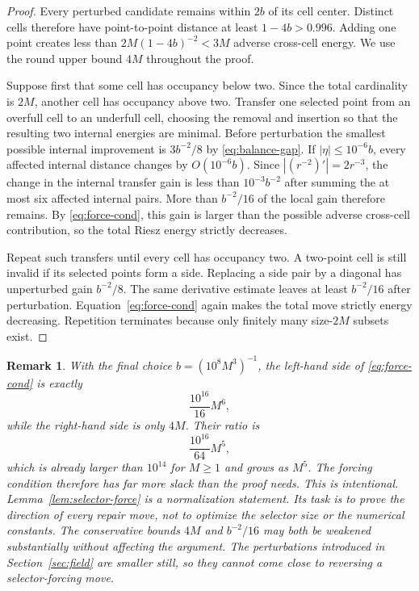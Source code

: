 \documentclass[12pt,a4paper]{article}
\newtheorem{remark}[theorem]{Remark}
\begin{document}
\begin{proof}
Every perturbed candidate remains within $2b$ of its cell center.  Distinct cells therefore have point-to-point distance at least $1-4b>0.996$.  Adding one point creates less than $2M(1-4b)^{-2}<3M$ adverse cross-cell energy.  We use the round upper bound $4M$ throughout the proof.

Suppose first that some cell has occupancy below two.  Since the total cardinality is $2M$, another cell has occupancy above two.  Transfer one selected point from an overfull cell to an underfull cell, choosing the removal and insertion so that the resulting two internal energies are minimal.  Before perturbation the smallest possible internal improvement is $3b^{-2}/8$ by \eqref{eq:balance-gap}.  If $|\eta|\le10^{-6}b$, every affected internal distance changes by $O(10^{-6}b)$.  Since $|(r^{-2})'|=2r^{-3}$, the change in the internal transfer gain is less than $10^{-3}b^{-2}$ after summing the at most six affected internal pairs.  More than $b^{-2}/16$ of the local gain therefore remains.  By \eqref{eq:force-cond}, this gain is larger than the possible adverse cross-cell contribution, so the total Riesz energy strictly decreases.

Repeat such transfers until every cell has occupancy two.  A two-point cell is still invalid if its selected points form a side.  Replacing a side pair by a diagonal has unperturbed gain $b^{-2}/8$.  The same derivative estimate leaves at least $b^{-2}/16$ after perturbation.  Equation~\eqref{eq:force-cond} again makes the total move strictly energy decreasing.  Repetition terminates because only finitely many size-$2M$ subsets exist.
\end{proof}

\begin{remark}
With the final choice $b=(10^8M^3)^{-1}$, the left-hand side of \eqref{eq:force-cond} is exactly
\[
 \frac{10^{16}}{16}M^6,
\]
while the right-hand side is only $4M$.  Their ratio is
\[
 \frac{10^{16}}{64}M^5,
\]
which is already larger than $10^{14}$ for $M\ge1$ and grows as $M^5$.  The forcing condition therefore has far more slack than the proof needs.  This is intentional.  Lemma~\ref{lem:selector-force} is a normalization statement.  Its task is to prove the direction of every repair move, not to optimize the selector size or the numerical constants.  The conservative bounds $4M$ and $b^{-2}/16$ may both be weakened substantially without affecting the argument.  The perturbations introduced in Section~\ref{sec:field} are smaller still, so they cannot come close to reversing a selector-forcing move.
\end{remark}
\end{document}
